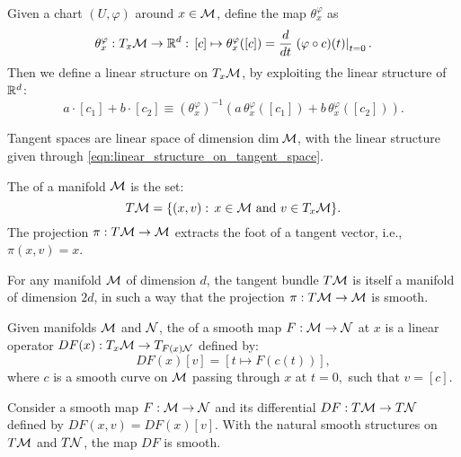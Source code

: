 \documentclass[11pt,a4paper]{article}
\begin{document}
Given a chart $(U,\varphi)$ around $x\in \mathcal{M}$, define the map $\theta^\varphi_x$ as
\begin{equation*}
\theta^\varphi_x:T_x\mathcal{M}\rightarrow \mathbb{R}^d:\,[c]\mapsto \theta^\varphi_x([c]) = \dfrac{d}{dt}\left.(\varphi\circ c)(t)\right|_{t=0}.
\end{equation*}
Then we define a linear structure on $T_x\mathcal{M}$, by exploiting the linear structure of $\mathbb{R}^d$:
\begin{equation}\label{eqn:linear_structure_on_tangent_space}
a\cdot [c_1]+b\cdot [c_2] \equiv (\theta^\varphi_x)^{-1}(a\, \theta^\varphi_x([c_1])+b\, \theta^\varphi_x([c_2])).
\end{equation}

\begin{proposition}
Tangent spaces are linear space of dimension dim$\,\mathcal{M}$, with the linear structure given through \eqref{eqn:linear_structure_on_tangent_space}.
\end{proposition}

\begin{definition}
The  of a manifold $\mathcal{M}$ is the set:
\begin{equation*}
T\mathcal{M} = \{ (x,v):\, x\in \mathcal{M}\text{ and }v\in T_x\mathcal{M} \}.
\end{equation*}
The projection $\pi:T\mathcal{M}\rightarrow \mathcal{M}$ extracts the foot of a tangent vector, i.e., $\pi(x,v) = x$.
\end{definition}

\begin{proposition}
For any manifold $\mathcal{M}$ of dimension $d$, the tangent bundle $T\mathcal{M}$ is itself a manifold of dimension $2d$, in such a way that the projection $\pi:T\mathcal{M}\rightarrow \mathcal{M}$ is smooth.
\end{proposition}

\begin{definition}
Given manifolds $\mathcal{M}$ and $\mathcal{N}$, the  of a smooth map $F:\mathcal{M}\rightarrow \mathcal{N}$ at $x$ is a linear operator $DF(x):T_x\mathcal{M}\rightarrow T_{F(x)\mathcal{N}}$ defined by:
\begin{equation*}
DF(x)[v] = [t\mapsto F(c(t))],
\end{equation*}
where $c$ is a smooth curve on $\mathcal{M}$ passing through $x$ at $t = 0,$ such that $v = [c]$.
\end{definition}

\begin{proposition}
Consider a smooth map $F:\mathcal{M}\rightarrow \mathcal{N}$ and its differential $DF:T\mathcal{M}\rightarrow T\mathcal{N}$ defined by $DF(x,v) = DF(x)[v]$. With the natural smooth structures on $T\mathcal{M}$ and $T\mathcal{N}$, the map $DF$ is smooth.
\end{proposition}
\end{document}
